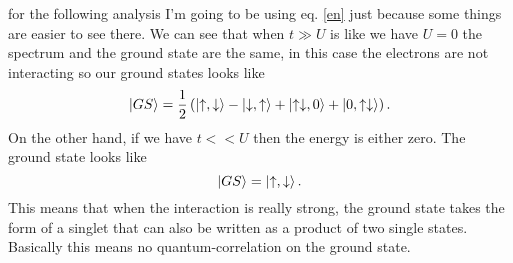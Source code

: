 \begin{questions}
\begin{solution}
for the following analysis I'm going to be using eq. \ref{en} just because some things are easier to see there.
We can see that when $t\gg U$ is like we have $U=0$ the spectrum and the ground state are the same, in this case the electrons are not interacting so our ground states looks like
\begin{equation}
  \ket{GS} = \frac{1}{2}\left( \ket{\uparrow, \downarrow} - \ket{\downarrow, \uparrow}  + \ket{\uparrow \downarrow, 0} + \ket{0, \uparrow \downarrow}\right).
\end{equation}
On the other hand, if we have $t<<U$ then the energy is either zero. The ground state looks like
\begin{equation}
  \ket{GS} = \ket{\uparrow, \downarrow}.
\end{equation}
This means that when the interaction is really strong, the ground state takes the form of a singlet that can also be written as a product of two single states. Basically this means no quantum-correlation on the ground state.
\end{solution}
\end{questions}


%
%
